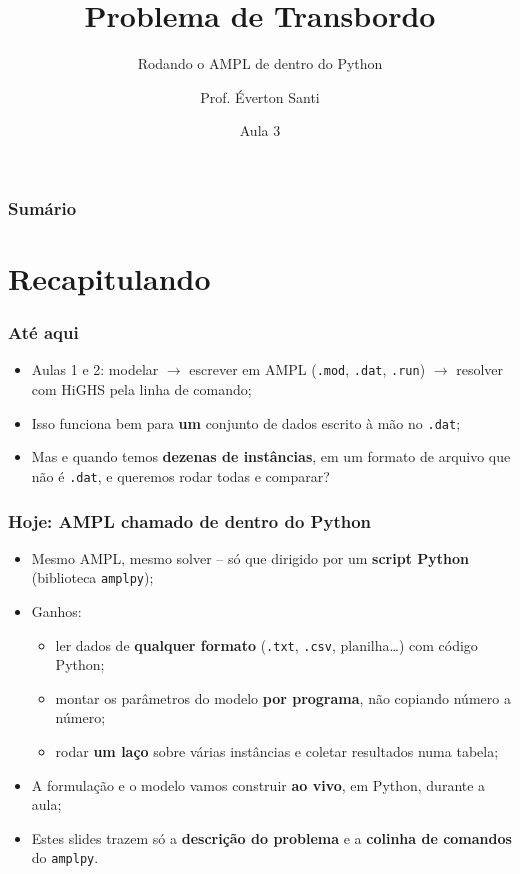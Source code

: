 \documentclass[fleqn]{beamer}
\title[Aula 3 -- AMPL + Python]{Problema de Transbordo}
\subtitle{Rodando o AMPL de dentro do Python}
\author[Santi]{Prof. \'Everton Santi}
\institute[UFRN/ECT]{ECT2524 -- Introdução à Otimização \\ Escola de Ciências e Tecnologia -- UFRN}
\date{Aula 3}
\begin{document}
\begin{frame}
	\titlepage
\end{frame}

\begin{frame}
	\frametitle{Sumário}
	\tableofcontents
\end{frame}

\section{Recapitulando}

\begin{frame}
	\frametitle{Até aqui}
	\begin{itemize}
		\item Aulas 1 e 2: modelar $\rightarrow$ escrever em AMPL
			(\texttt{.mod}, \texttt{.dat}, \texttt{.run}) $\rightarrow$
			resolver com HiGHS pela linha de comando;
		\item Isso funciona bem para \textbf{um} conjunto de dados escrito
			à mão no \texttt{.dat};
		\item Mas e quando temos \textbf{dezenas de instâncias}, em um
			formato de arquivo que não é \texttt{.dat}, e queremos rodar
			todas e comparar?
	\end{itemize}
\end{frame}

\begin{frame}
	\frametitle{Hoje: AMPL chamado de dentro do Python}
	\begin{itemize}
		\item Mesmo AMPL, mesmo solver -- só que dirigido por um
			\textbf{script Python} (biblioteca \texttt{amplpy});
		\item Ganhos:
		\begin{itemize}
			\item ler dados de \textbf{qualquer formato} (\texttt{.txt},
				\texttt{.csv}, planilha\dots) com código Python;
			\item montar os parâmetros do modelo \textbf{por programa},
				não copiando número a número;
			\item rodar \textbf{um laço} sobre várias instâncias e
				coletar resultados numa tabela;
		\end{itemize}
		\item A formulação e o modelo vamos construir \textbf{ao vivo},
			em Python, durante a aula;
		\item Estes slides trazem só a \textbf{descrição do problema} e a
			\textbf{colinha de comandos} do \texttt{amplpy}.
	\end{itemize}
\end{frame}
\end{document}
